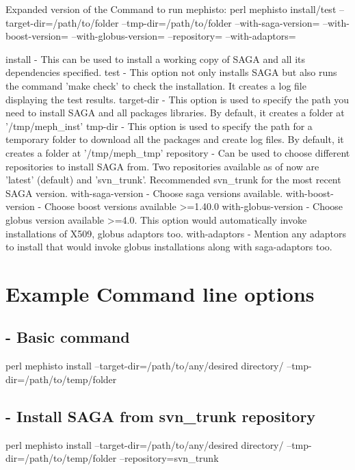 \documentclass[a4paper,10pt]{article}
\begin{document}
Expanded version of the Command to run mephisto: perl mephisto  install/test   --target-dir=/path/to/folder  --tmp-dir=/path/to/folder    --with-saga-version=        --with-boost-version=     --with-globus-version=    --repository=  --with-adaptors=

install                        -  This can be used to install a working copy of SAGA and all its dependencies specified. 
test                             -  This option not only installs SAGA but also runs the command 'make check' to check the installation. It creates a log file displaying the test results.
target-dir                   -  This option is used to specify the path you need to install SAGA and all packages libraries. By default, it creates a folder at '/tmp/meph_inst' 
tmp-dir                       -  This option is used to specify the path for a temporary folder to download all the packages and create log files. By default, it creates a folder at '/tmp/meph_tmp'
repository                  -  Can be used to choose different repositories to install SAGA from. Two repositories available as of now are 'latest' (default) and 'svn_trunk'. Recommended svn_trunk for the                                most recent SAGA version. 
with-saga-version    - Choose saga versions available.
with-boost-version   - Choose boost versions available  >=1.40.0
with-globus-version - Choose globus version available >=4.0. This option would automatically invoke installations of X509, globus adaptors too. 
with-adaptors            - Mention any adaptors to install that would invoke globus installations along with saga-adaptors too. 

\section*{Example Command line options}

\subsection*{- Basic command}
perl mephisto install --target-dir=/path/to/any/desired directory/ --tmp-dir=/path/to/temp/folder 

\subsection*{- Install SAGA from svn_trunk repository}
perl mephisto install --target-dir=/path/to/any/desired directory/ --tmp-dir=/path/to/temp/folder --repository=svn_trunk
\end{document}
